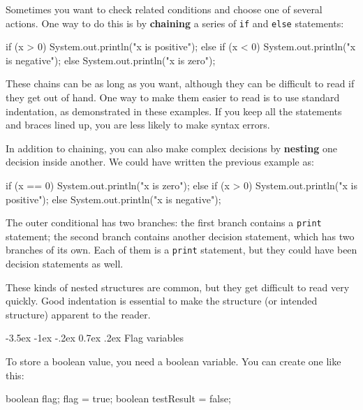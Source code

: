 \documentclass[12pt]{book}
\makeatletter
\theoremstyle{exercise}
\newcommand{\java}[1]{\verb"#1"}
\renewcommand{\section}{\@startsection{section}{1}{\z@}%
    {-3.5ex \@plus -1ex \@minus -.2ex}%
    {0.7ex \@plus.2ex}%
    {\normalfont\Large\bfseries}}
\newcommand{\java}[1]{\lstinline{#1}} %
\makeatother
\begin{document}

Sometimes you want to check related conditions and choose one of several actions.
One way to do this is by {\bf chaining} a series of \java{if} and \java{else} statements:

\begin{code}
    if (x > 0) {
        System.out.println("x is positive");
    } else if (x < 0) {
        System.out.println("x is negative");
    } else {
        System.out.println("x is zero");
    }
\end{code}

These chains can be as long as you want, although they can be difficult to read if they get out of hand.
One way to make them easier to read is to use standard indentation, as demonstrated in these examples.
If you keep all the statements and braces lined up, you are less likely to make syntax errors.


In addition to chaining, you can also make complex decisions by {\bf nesting} one decision inside another.
We could have written the previous example as:

\begin{code}
    if (x == 0) {
        System.out.println("x is zero");
    } else {
        if (x > 0) {
            System.out.println("x is positive");
        } else {
            System.out.println("x is negative");
        }
    }
\end{code}

The outer conditional has two branches:
the first branch contains a \java{print} statement; the second branch contains another decision statement, which has two branches of its own.
Each of them is a \java{print} statement, but they could have been decision statements as well.

These kinds of nested structures are common, but they get difficult to read very quickly.
Good indentation is essential to make the structure (or intended structure) apparent to the reader.


\section{Flag variables}


To store a boolean value, you need a boolean variable.
You can create one like this:

\begin{code}
    boolean flag;
    flag = true;
    boolean testResult = false;
\end{code}
\end{document}
